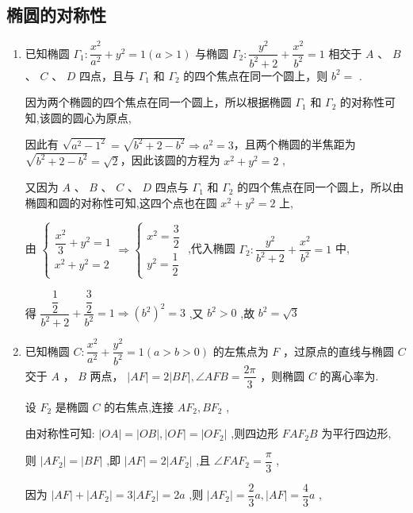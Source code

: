 \subsection*{椭圆的对称性}
\begin{enumerate}
    \item 已知椭圆 $\Gamma_1 : \dfrac{x^2}{a^2} + y^2 = 1(a > 1)$ 与椭圆 $\Gamma_2 : \dfrac{y^2}{b^2 + 2} + \dfrac{x^2}{b^2} = 1$ 相交于 $A$ 、 $B$ 、 $C$ 、 $D$ 四点，且与 $\Gamma_1$ 和 $\Gamma_2$ 的四个焦点在同一个圆上，则 $b^2 =$ .
    \begin{jieda}
        因为两个椭圆的四个焦点在同一个圆上，所以根据椭圆 $\Gamma_1$ 和 $\Gamma_2$ 的对称性可知,该圆的圆心为原点,

        因此有 $\sqrt{a^2 - 1^2} = \sqrt{b^2 + 2 - b^2} \Rightarrow a^2 = 3$，且两个椭圆的半焦距为 $\sqrt{b^2 + 2 - b^2} = \sqrt{2}$，因此该圆的方程为 $x^2 + y^2 = 2$ ,

        又因为 $A$ 、 $B$ 、 $C$ 、 $D$ 四点与 $\Gamma_1$ 和 $\Gamma_2$ 的四个焦点在同一个圆上，所以由椭圆和圆的对称性可知,这四个点也在圆 $x^2 + y^2 = 2$ 上,

        由 $\left\{ \begin{array}{l} \dfrac{x^2}{3} + y^2 = 1 \\  x^2 + y^2 = 2 \end{array} \Rightarrow \left\{ \begin{array}{l} x^2 = \dfrac{3}{2} \\  y^2 = \dfrac{1}{2} \end{array}\right.\right.$ ,代入椭圆 $\Gamma_2 : \dfrac{y^2}{b^2 + 2} + \dfrac{x^2}{b^2} = 1$ 中,

        得 $\dfrac{\dfrac{1}{2}}{b^2 + 2} + \dfrac{\dfrac{3}{2}}{b^2} = 1 \Rightarrow \left( b^2\right)^2 = 3$ ,又 $b^2 > 0$ ,故 $b^2 = \sqrt{3}$
    \end{jieda}
    \item 已知椭圆 $C : \dfrac{x^2}{a^2} + \dfrac{y^2}{b^2} = 1(a > b > 0)$ 的左焦点为 $F$ ，过原点的直线与椭圆 $C$ 交于 $A$ ， $B$ 两点， $|AF| = 2|BF| ,\angle AFB = \dfrac{2\pi}{3}$ ，则椭圆 $C$ 的离心率为.
    \begin{jieda}
        设 $F_2$ 是椭圆 $C$ 的右焦点,连接 $AF_2,BF_2$ ,

        由对称性可知: $|OA| = |OB| ,|OF| = |OF_2|$ ,则四边形 $FAF_{2}B$ 为平行四边形,

        则 $|AF_2| = |BF|$ ,即 $|AF| = 2|AF_2|$ ,且 $\angle FAF_2 = \dfrac{\pi}{3}$ ,

        因为 $|AF| + |AF_2| = 3|AF_2| = 2a$ ,则 $|AF_2| = \dfrac{2}{3}a,|AF| = \dfrac{4}{3}a$ ,


\end{jieda}
\end{enumerate}
